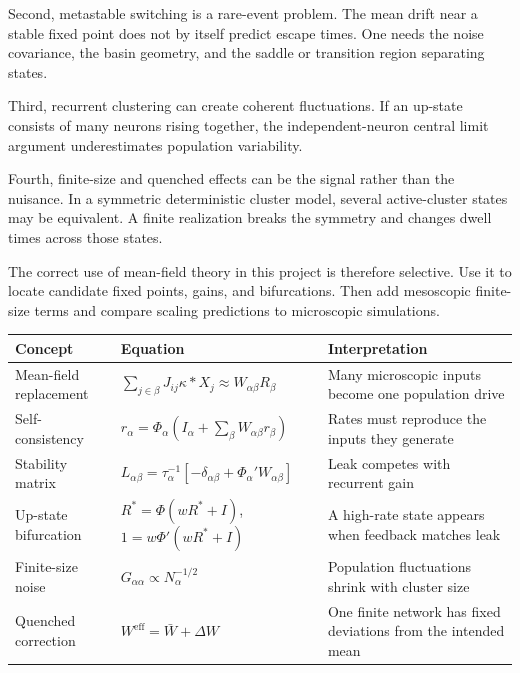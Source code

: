 Second, metastable switching is a rare-event problem. The mean drift near a stable fixed point does not by itself predict escape times. One needs the noise covariance, the basin geometry, and the saddle or transition region separating states.

Third, recurrent clustering can create coherent fluctuations. If an up-state consists of many neurons rising together, the independent-neuron central limit argument underestimates population variability.

Fourth, finite-size and quenched effects can be the signal rather than the nuisance. In a symmetric deterministic cluster model, several active-cluster states may be equivalent. A finite realization breaks the symmetry and changes dwell times across those states.

The correct use of mean-field theory in this project is therefore selective. Use it to locate candidate fixed points, gains, and bifurcations. Then add mesoscopic finite-size terms and compare scaling predictions to microscopic simulations.

\begin{chaptersummary}

\begin{center}
\renewcommand{\arraystretch}{1.55}
\begin{tabularx}{\textwidth}{@{}l X X@{}}
  \toprule
  \textbf{Concept} & \textbf{Equation} & \textbf{Interpretation} \\
  \midrule
  Mean-field replacement &
  $\sum_{j\in\beta}J_{ij}\kappa*X_j \approx W_{\alpha\beta}R_\beta$ &
  Many microscopic inputs become one population drive \\
  Self-consistency &
  $r_\alpha=\Phi_\alpha(I_\alpha+\sum_\beta W_{\alpha\beta}r_\beta)$ &
  Rates must reproduce the inputs they generate \\
  Stability matrix &
  $L_{\alpha\beta}=\tau_\alpha^{-1}[-\delta_{\alpha\beta}+\Phi_\alpha'W_{\alpha\beta}]$ &
  Leak competes with recurrent gain \\
  Up-state bifurcation &
  $R^*=\Phi(wR^*+I)$, $1=w\Phi'(wR^*+I)$ &
  A high-rate state appears when feedback matches leak \\
  Finite-size noise &
  $G_{\alpha\alpha}\propto N_\alpha^{-1/2}$ &
  Population fluctuations shrink with cluster size \\
  Quenched correction &
  $W^{\mathrm{eff}}=\bar W+\Delta W$ &
  One finite network has fixed deviations from the intended mean \\
  \bottomrule
\end{tabularx}
\end{center}

\end{chaptersummary}

